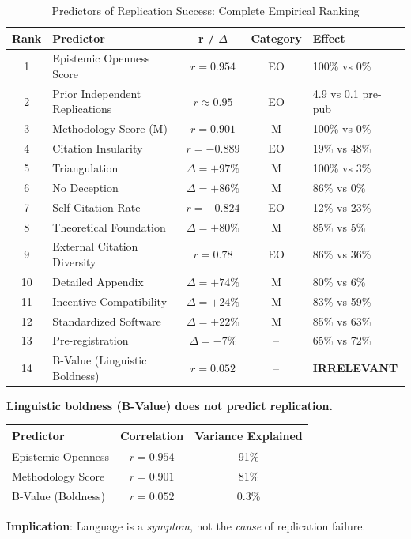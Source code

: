 \documentclass[11pt,a4paper]{article}
\begin{document}
\begin{table}[h]
\centering
\caption{Predictors of Replication Success: Complete Empirical Ranking}
\label{tab:ranking}
\begin{tabular}{clccp{4cm}}
\toprule
\textbf{Rank} & \textbf{Predictor} & \textbf{r / $\Delta$} & \textbf{Category} & \textbf{Effect} \\
\midrule
1 & Epistemic Openness Score & $r = 0.954$ & EO & 100\% vs 0\% \\
2 & Prior Independent Replications & $r \approx 0.95$ & EO & 4.9 vs 0.1 pre-pub \\
3 & Methodology Score (M) & $r = 0.901$ & M & 100\% vs 0\% \\
4 & Citation Insularity & $r = -0.889$ & EO & 19\% vs 48\% \\
5 & Triangulation & $\Delta = +97\%$ & M & 100\% vs 3\% \\
6 & No Deception & $\Delta = +86\%$ & M & 86\% vs 0\% \\
7 & Self-Citation Rate & $r = -0.824$ & EO & 12\% vs 23\% \\
8 & Theoretical Foundation & $\Delta = +80\%$ & M & 85\% vs 5\% \\
9 & External Citation Diversity & $r = 0.78$ & EO & 86\% vs 36\% \\
10 & Detailed Appendix & $\Delta = +74\%$ & M & 80\% vs 6\% \\
11 & Incentive Compatibility & $\Delta = +24\%$ & M & 83\% vs 59\% \\
12 & Standardized Software & $\Delta = +22\%$ & M & 85\% vs 63\% \\
13 & Pre-registration & $\Delta = -7\%$ & -- & 65\% vs 72\% \\
14 & B-Value (Linguistic Boldness) & $r = 0.052$ & -- & \textbf{IRRELEVANT} \\
\bottomrule
\end{tabular}
\end{table}

\begin{keyinsight}[title={The Fundamental Discovery}]
\textbf{Linguistic boldness (B-Value) does not predict replication.}

\begin{center}
\begin{tabular}{lcc}
\toprule
\textbf{Predictor} & \textbf{Correlation} & \textbf{Variance Explained} \\
\midrule
Epistemic Openness & $r = 0.954$ & 91\% \\
Methodology Score & $r = 0.901$ & 81\% \\
B-Value (Boldness) & $r = 0.052$ & 0.3\% \\
\bottomrule
\end{tabular}
\end{center}

\textbf{Implication}: Language is a \textit{symptom}, not the \textit{cause} of replication failure.
\end{keyinsight}
\end{document}
